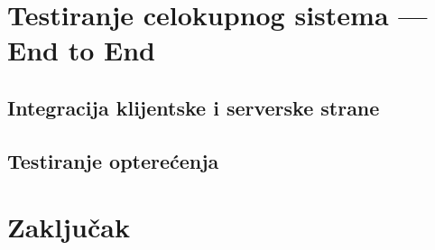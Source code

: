 \documentclass[12pt,oneside]{memoir}
\begin{document}
\chapter{Testiranje celokupnog sistema --- End to End}
\label{chp:e2e}

\section{Integracija klijentske i serverske strane}

\section{Testiranje opterećenja}

\chapter{Zaključak}

\literatura

\backmatter


\end{document}
